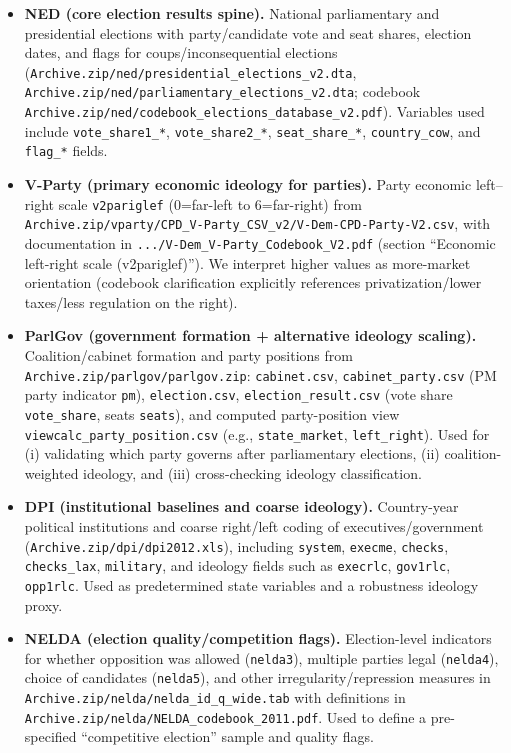 \documentclass[11pt]{article}
\newcommand{\1}{\mathbf{1}}
\begin{document}
\begin{itemize}[leftmargin=1.2em]
\item \textbf{NED (core election results spine).} National parliamentary and presidential elections with party/candidate vote and seat shares, election dates, and flags for coups/inconsequential elections (\texttt{Archive.zip/ned/presidential\_elections\_v2.dta}, \texttt{Archive.zip/ned/parliamentary\_elections\_v2.dta}; codebook \texttt{Archive.zip/ned/codebook\_elections\_database\_v2.pdf}). Variables used include \texttt{vote\_share1\_*}, \texttt{vote\_share2\_*}, \texttt{seat\_share\_*}, \texttt{country\_cow}, and \texttt{flag\_*} fields.
\item \textbf{V-Party (primary economic ideology for parties).} Party economic left--right scale \texttt{v2pariglef} (0=far-left to 6=far-right) from \texttt{Archive.zip/vparty/CPD\_V-Party\_CSV\_v2/V-Dem-CPD-Party-V2.csv}, with documentation in \texttt{.../V-Dem\_V-Party\_Codebook\_V2.pdf} (section ``Economic left-right scale (v2pariglef)''). We interpret higher values as more-market orientation (codebook clarification explicitly references privatization/lower taxes/less regulation on the right).
\item \textbf{ParlGov (government formation + alternative ideology scaling).} Coalition/cabinet formation and party positions from \texttt{Archive.zip/parlgov/parlgov.zip}: \texttt{cabinet.csv}, \texttt{cabinet\_party.csv} (PM party indicator \texttt{pm}), \texttt{election.csv}, \texttt{election\_result.csv} (vote share \texttt{vote\_share}, seats \texttt{seats}), and computed party-position view \texttt{viewcalc\_party\_position.csv} (e.g., \texttt{state\_market}, \texttt{left\_right}). Used for (i) validating which party governs after parliamentary elections, (ii) coalition-weighted ideology, and (iii) cross-checking ideology classification.
\item \textbf{DPI (institutional baselines and coarse ideology).} Country-year political institutions and coarse right/left coding of executives/government (\texttt{Archive.zip/dpi/dpi2012.xls}), including \texttt{system}, \texttt{execme}, \texttt{checks}, \texttt{checks\_lax}, \texttt{military}, and ideology fields such as \texttt{execrlc}, \texttt{gov1rlc}, \texttt{opp1rlc}. Used as predetermined state variables and a robustness ideology proxy.
\item \textbf{NELDA (election quality/competition flags).} Election-level indicators for whether opposition was allowed (\texttt{nelda3}), multiple parties legal (\texttt{nelda4}), choice of candidates (\texttt{nelda5}), and other irregularity/repression measures in \texttt{Archive.zip/nelda/nelda\_id\_q\_wide.tab} with definitions in \texttt{Archive.zip/nelda/NELDA\_codebook\_2011.pdf}. Used to define a pre-specified ``competitive election'' sample and quality flags.

\end{itemize}
\end{document}
